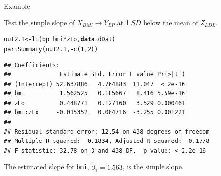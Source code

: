 \documentclass{beamer}\usepackage[]{graphicx}\usepackage[]{color}
\makeatletter
\newcommand{\hlnum}[1]{\textcolor[rgb]{0.69,0.494,0}{#1}}%
\newcommand{\hlopt}[1]{\textcolor[rgb]{0,0,0}{#1}}%
\newcommand{\hlstd}[1]{\textcolor[rgb]{0,0,0}{#1}}%
\newcommand{\hlkwb}[1]{\textcolor[rgb]{0,0.341,0.682}{#1}}%
\newcommand{\hlkwc}[1]{\textcolor[rgb]{0,0,0}{\textbf{#1}}}%
\newcommand{\hlkwd}[1]{\textcolor[rgb]{0.004,0.004,0.506}{#1}}%
\newenvironment{kframe}{%
 \def\at@end@of@kframe{}%
 \ifinner\ifhmode%
  \def\at@end@of@kframe{\end{minipage}}%
  \begin{minipage}{\columnwidth}%
 \fi\fi%
 \def\FrameCommand##1{\hskip\@totalleftmargin \hskip-\fboxsep
 \colorbox{shadecolor}{##1}\hskip-\fboxsep
     \hskip-\linewidth \hskip-\@totalleftmargin \hskip\columnwidth}%
 \MakeFramed {\advance\hsize-\width
   \@totalleftmargin\z@ \linewidth\hsize
   \@setminipage}}%
 {\par\unskip\endMakeFramed%
 \at@end@of@kframe}
\newenvironment{knitrout}{}{} %
\makeatother
\begin{document}

\begin{frame}[fragile]{Example}

  Test the simple slope of $X_{BMI} \rightarrow Y_{BP}$ at 1 $SD$ below the mean 
  of $Z_{LDL}$.
\begin{knitrout}\footnotesize
{}\color{fgcolor}\begin{kframe}
\begin{alltt}
\hlstd{out2.1} \hlkwb{<-} \hlkwd{lm}\hlstd{(bp} \hlopt{~} \hlstd{bmi}\hlopt{*}\hlstd{zLo,} \hlkwc{data} \hlstd{= dDat)}
\hlkwd{partSummary}\hlstd{(out2.1,} \hlopt{-}\hlkwd{c}\hlstd{(}\hlnum{1}\hlstd{,} \hlnum{2}\hlstd{))}
\end{alltt}
\begin{verbatim}
## Coefficients:
##              Estimate Std. Error t value Pr(>|t|)
## (Intercept) 52.637886   4.764883  11.047  < 2e-16
## bmi          1.562525   0.185667   8.416 5.59e-16
## zLo          0.448771   0.127160   3.529 0.000461
## bmi:zLo     -0.015352   0.004716  -3.255 0.001221
## 
## Residual standard error: 12.54 on 438 degrees of freedom
## Multiple R-squared:  0.1834,	Adjusted R-squared:  0.1778 
## F-statistic: 32.78 on 3 and 438 DF,  p-value: < 2.2e-16
\end{verbatim}
\end{kframe}
\end{knitrout}
The estimated slope for \texttt{bmi}, $\hat{\beta}_1 = 
1.563$, is the simple slope.
 
\end{frame}

\end{document}

